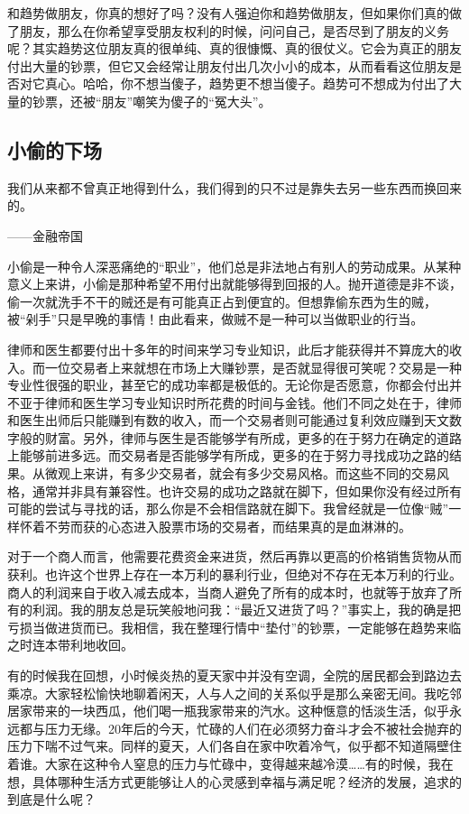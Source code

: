 和趋势做朋友，你真的想好了吗？没有人强迫你和趋势做朋友，但如果你们真的做了朋友，那么在你希望享受朋友权利的时候，问问自己，是否尽到了朋友的义务呢？其实趋势这位朋友真的很单纯、真的很慷慨、真的很仗义。它会为真正的朋友付出大量的钞票，但它又会经常让朋友付出几次小小的成本，从而看看这位朋友是否对它真心。哈哈，你不想当傻子，趋势更不想当傻子。趋势可不想成为付出了大量的钞票，还被“朋友”嘲笑为傻子的“冤大头”。

\subsection{小偷的下场}

{\kaishu
我们从来都不曾真正地得到什么，我们得到的只不过是靠失去另一些东西而换回来的。

\hfill ——金融帝国
}

小偷是一种令人深恶痛绝的“职业”，他们总是非法地占有别人的劳动成果。从某种意义上来讲，小偷是那种希望不用付出就能够得到回报的人。抛开道德是非不谈，偷一次就洗手不干的贼还是有可能真正占到便宜的。但想靠偷东西为生的贼，被“剁手”只是早晚的事情！由此看来，做贼不是一种可以当做职业的行当。

律师和医生都要付出十多年的时间来学习专业知识，此后才能获得并不算庞大的收入。而一位交易者上来就想在市场上大赚钞票，是否就显得很可笑呢？交易是一种专业性很强的职业，甚至它的成功率都是极低的。无论你是否愿意，你都会付出并不亚于律师和医生学习专业知识时所花费的时间与金钱。他们不同之处在于，律师和医生出师后只能赚到有数的收入，而一个交易者则可能通过复利效应赚到天文数字般的财富。另外，律师与医生是否能够学有所成，更多的在于努力在确定的道路上能够前进多远。而交易者是否能够学有所成，更多的在于努力寻找成功之路的结果。从微观上来讲，有多少交易者，就会有多少交易风格。而这些不同的交易风格，通常并非具有兼容性。也许交易的成功之路就在脚下，但如果你没有经过所有可能的尝试与寻找的话，那么你是不会相信路就在脚下。我曾经就是一位像“贼”一样怀着不劳而获的心态进入股票市场的交易者，而结果真的是血淋淋的。

对于一个商人而言，他需要花费资金来进货，然后再靠以更高的价格销售货物从而获利。也许这个世界上存在一本万利的暴利行业，但绝对不存在无本万利的行业。商人的利润来自于收入减去成本，当商人避免了所有的成本时，也就等于放弃了所有的利润。我的朋友总是玩笑般地问我：“最近又进货了吗？”事实上，我的确是把亏损当做进货而已。我相信，我在整理行情中“垫付”的钞票，一定能够在趋势来临之时连本带利地收回。

有的时候我在回想，小时候炎热的夏天家中并没有空调，全院的居民都会到路边去乘凉。大家轻松愉快地聊着闲天，人与人之间的关系似乎是那么亲密无间。我吃邻居家带来的一块西瓜，他们喝一瓶我家带来的汽水。这种惬意的恬淡生活，似乎永远都与压力无缘。20年后的今天，忙碌的人们在必须努力奋斗才会不被社会抛弃的压力下喘不过气来。同样的夏天，人们各自在家中吹着冷气，似乎都不知道隔壁住着谁。大家在这种令人窒息的压力与忙碌中，变得越来越冷漠……有的时候，我在想，具体哪种生活方式更能够让人的心灵感到幸福与满足呢？经济的发展，追求的到底是什么呢？

